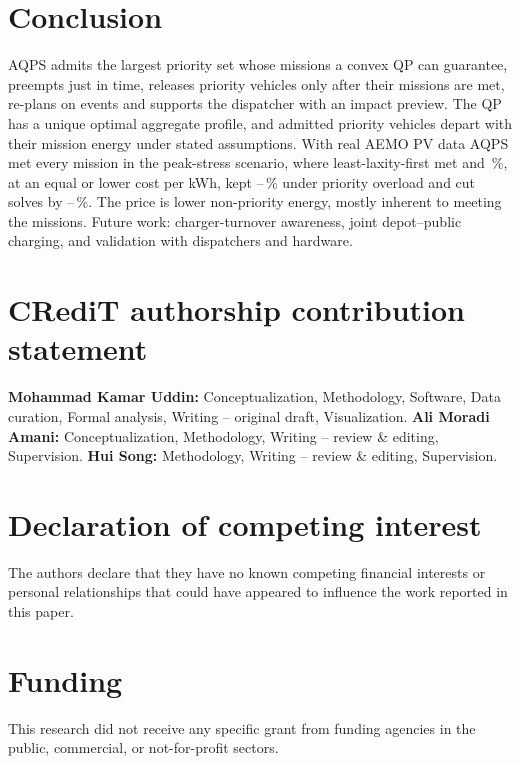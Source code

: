 \documentclass[preprint,12pt]{elsarticle}
\begin{document}
\section{Conclusion}
\label{sec:conclusion}
AQPS admits the largest priority set whose missions a convex QP can guarantee, preempts just in time,
releases priority vehicles only after their missions are met, re-plans on events and supports the dispatcher
with an impact preview. The QP has a unique optimal aggregate profile, and admitted priority vehicles depart
with their mission energy under stated assumptions. With real AEMO PV data AQPS met every mission in the
peak-stress scenario, where least-laxity-first met \RMissionLLFSThreeFortyFive{} and
\RMissionLLFSThreeNinety\,\%, at an equal or lower cost per kWh, kept
\ROverloadMissionMinRTET--\ROverloadMissionMaxRTET\,\% under priority overload and cut solves by
\RTotRedMin--\RTotRedMax\,\%. The price is lower non-priority energy, mostly inherent to meeting the missions.
Future work: charger-turnover awareness, joint depot--public charging, and validation with dispatchers and
hardware.

\section*{CRediT authorship contribution statement}
\textbf{Mohammad Kamar Uddin:} Conceptualization, Methodology, Software, Data curation, Formal analysis,
Writing -- original draft, Visualization. \textbf{Ali Moradi Amani:} Conceptualization, Methodology,
Writing -- review \& editing, Supervision. \textbf{Hui Song:} Methodology, Writing -- review \& editing,
Supervision.

\section*{Declaration of competing interest}
The authors declare that they have no known competing financial interests or personal relationships that
could have appeared to influence the work reported in this paper.

\section*{Funding}
This research did not receive any specific grant from funding agencies in the public, commercial, or
not-for-profit sectors.
\end{document}
